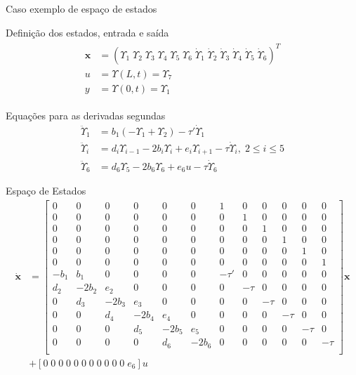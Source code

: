 \documentclass[10pt]{beamer}
\newcommand\Fontvi{\fontsize{6}{7.2}\selectfont}
\begin{document}
\begin{frame}[fragile]{Caso exemplo de espaço de estados}
\begin{block}{Definição dos estados, entrada e saída}
	\begin{align}
	\begin{array}{ll}
	\mathbf{x} &= \left(\Upsilon_1\;\Upsilon_2\;\Upsilon_3\;\Upsilon_4\;\Upsilon_5\;\Upsilon_6\;\dot{\Upsilon}_1\;\dot{\Upsilon}_2\;\dot{\Upsilon}_3\;\dot{\Upsilon}_4\;\dot{\Upsilon}_5\;\dot{\Upsilon}_6\right)^T\\
	u &= \Upsilon(L,t) = \Upsilon_7\\
	y &= \Upsilon(0,t) = \Upsilon_1
\end{array}
 \end{align} 
\end{block}

\begin{block}{Equações para as derivadas segundas}
\begin{align}
	\ddot{\Upsilon}_1 &= b_1\left(-\Upsilon_1 + \Upsilon_2\right) - \tau'\dot{\Upsilon}_1\\
	\ddot{\Upsilon}_i &=d_i\Upsilon_{i-1} - 2b_i \Upsilon_{i} + e_i\Upsilon_{i+1} - \tau \dot{\Upsilon}_i,\; 2\le i \le 5\\
	\ddot{\Upsilon}_6 &= d_6\Upsilon_5 - 2b_6 \Upsilon_6 + e_6 u - \tau \dot{\Upsilon}_6
\end{align}	
\end{block}
\end{frame}

\begin{frame}[fragile]{Espaço de Estados}
\Fontvi
	\begin{align}
 	\dot{\mathbf{x}} &= \left[\begin{array}{cccccccccccc}
 		0 & 0 & 0 & 0 & 0 & 0 & 1 & 0 & 0 & 0 & 0 & 0\\
 		0 & 0 & 0 & 0 & 0 & 0 & 0 & 1 & 0 & 0 & 0 & 0\\
 		0 & 0 & 0 & 0 & 0 & 0 & 0 & 0 & 1 & 0 & 0 & 0\\
 		0 & 0 & 0 & 0 & 0 & 0 & 0 & 0 & 0 & 1 & 0 & 0\\
 		0 & 0 & 0 & 0 & 0 & 0 & 0 & 0 & 0 & 0 & 1 & 0\\
 		0 & 0 & 0 & 0 & 0 & 0 & 0 & 0 & 0 & 0 & 0 & 1\\
 		-b_1 & b_1 & 0 & 0 & 0 & 0 & -\tau' & 0     & 0 & 0 & 0 & 0\\
 		d_2 & -2b_2  & e_2  & 0  & 0 & 0 &  0    & -\tau & 0 & 0 & 0 & 0\\
 		0 & d_3 & -2b_3  & e_3  & 0  & 0 & 0 &  0    & -\tau & 0 & 0 & 0\\
 		0 & 0 & d_4 & -2b_4  & e_4  & 0  & 0 & 0 &  0    & -\tau & 0 & 0\\
 		0 & 0 & 0 & d_5 & -2b_5  & e_5  & 0  & 0 & 0 &  0    & -\tau & 0\\
 		0 & 0 & 0 & 0 & d_6 & -2b_6  & 0  & 0 & 0 &  0    & 0   &-\tau\\
 	\end{array}\right]\mathbf{x} \nonumber\\
 	&+ \left[0\;0\;0\;0\;0\;0\;0\;0\;0\;0\;0\;e_6\right]u
 \end{align}
\end{frame}
\end{document}
